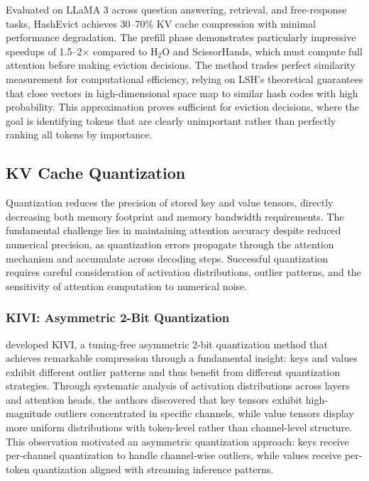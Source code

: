 \documentclass[11pt,letterpaper]{article}
\begin{document}
Evaluated on LLaMA 3 across question answering, retrieval, and free-response tasks, HashEvict achieves 30--70\% KV cache compression with minimal performance degradation. The prefill phase demonstrates particularly impressive speedups of 1.5--2$\times$ compared to H$_2$O and ScissorHands, which must compute full attention before making eviction decisions. The method trades perfect similarity measurement for computational efficiency, relying on LSH's theoretical guarantees that close vectors in high-dimensional space map to similar hash codes with high probability. This approximation proves sufficient for eviction decisions, where the goal is identifying tokens that are clearly unimportant rather than perfectly ranking all tokens by importance.

\subsection{KV Cache Quantization}

Quantization reduces the precision of stored key and value tensors, directly decreasing both memory footprint and memory bandwidth requirements. The fundamental challenge lies in maintaining attention accuracy despite reduced numerical precision, as quantization errors propagate through the attention mechanism and accumulate across decoding steps. Successful quantization requires careful consideration of activation distributions, outlier patterns, and the sensitivity of attention computation to numerical noise.

\subsubsection{KIVI: Asymmetric 2-Bit Quantization}

\cite{liu2024kivi} developed KIVI, a tuning-free asymmetric 2-bit quantization method that achieves remarkable compression through a fundamental insight: keys and values exhibit different outlier patterns and thus benefit from different quantization strategies. Through systematic analysis of activation distributions across layers and attention heads, the authors discovered that key tensors exhibit high-magnitude outliers concentrated in specific channels, while value tensors display more uniform distributions with token-level rather than channel-level structure. This observation motivated an asymmetric quantization approach: keys receive per-channel quantization to handle channel-wise outliers, while values receive per-token quantization aligned with streaming inference patterns.
\end{document}
